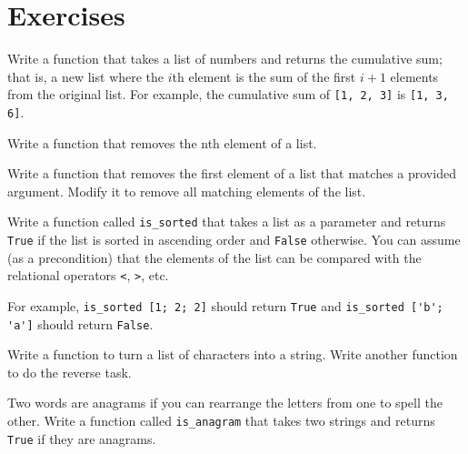 \documentclass[10pt]{book}
\begin{document}
\section{Exercises}

\begin{ex}
Write a function that takes a list of numbers and returns the
cumulative sum; that is, a new list where the $i$th element
is the sum of the first $i+1$ elements from the original list.
For example, the cumulative sum of {\tt [1, 2, 3]} is
{\tt [1, 3, 6]}. 
\end{ex}

\begin{ex}
Write a function that removes the nth element of a list.
\end{ex}

\begin{ex}
Write a function that removes the first element of a list that
matches a provided argument. Modify it to remove all matching 
elements of the list.
\end{ex}


\begin{ex}
Write a function called \verb"is_sorted" that takes a list as a
parameter and returns {\tt True} if the list is sorted in ascending
order and {\tt False} otherwise.  You can assume (as a precondition)
that the elements of the list can be compared with the relational
operators {\tt <}, {\tt >}, etc.


For example, \verb"is_sorted [1; 2; 2]" should return {\tt True}
and \verb"is_sorted ['b'; 'a']" should return {\tt False}.
\end{ex}

\begin{ex}
Write a function to turn a list of characters into a string. Write
another function to do the reverse task.
\end{ex}

\begin{ex}
\label{anagram}


Two words are anagrams if you can rearrange the letters from one
to spell the other.  Write a function called \verb"is_anagram"
that takes two strings and returns {\tt True} if they are anagrams.
\end{ex}
\end{document}
